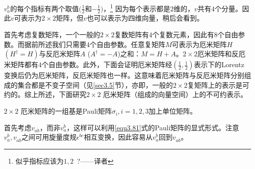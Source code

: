 $v_a^{\dot{b}}$的每个指标有两个取值$(\frac{1}{2}$和$-\frac{1}{2})$，\footnote{似乎指标应该为$1, 2$~?——译者} 因为每个表示都是$2$维的，$v$共有$4$个分量。因此$v$可表示为$2 \times 2$矩阵，但$v$也可以表示为四维向量，稍后会看到。

首先考虑复数矩阵，一个一般的$2 \times 2$复数矩阵有$4$个复数元素，因此有$8$个自由参数。而据前所述我们只需要$4$个自由参数。任意复矩阵$M$可表示为厄米矩阵$H$$(H^\dag = H)$与反厄米矩阵$A$ ($A^\dag = -A$)之和：$M = H + A$。$2 \times 2$厄米矩阵和反厄米矩阵都有$4$个自由参数。此外，下面会证明厄米矩阵经$(\frac{1}{2}, \frac{1}{2})$表示下的Lorentz变换后仍为厄米矩阵，反厄米矩阵也一样。这意味着厄米矩阵与反厄米矩阵分别组成的集合都是不变子空间（见\ref{sec3.5}节），亦即，一般的$2 \times 2$复矩阵上的表示是可约的。综上所述，下面研究$2 \times 2$ 厄米矩阵（组成的向量空间）上的不可约表示。

$2 \times 2$ 厄米矩阵的一组基是Pauli矩阵$\sigma_i, i = 1, 2, 3$加上单位矩阵。

首先考虑$v_{a\dot{b}}$，而非$v_a^{\dot{b}}$，这样可以利用\eqref{equ3.81}式的Pauli矩阵的显式形式。注意$v_a^{\dot{b}}, v_{a \dot{b}}$之间可用旋量度规$\epsilon^{\dot{bc}}$相互变换，因此容易从$v_a^{\dot{b}}$回到$v_{a \dot{b}}$。

